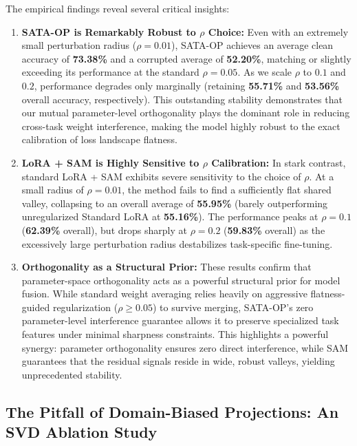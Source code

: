 \documentclass{article}
\theoremstyle{plain}
\theoremstyle{definition}
\theoremstyle{remark}
\begin{document}
The empirical findings reveal several critical insights:
\begin{enumerate}
    \item \textbf{SATA-OP is Remarkably Robust to $\rho$ Choice:} Even with an extremely small perturbation radius ($\rho = 0.01$), SATA-OP achieves an average clean accuracy of \textbf{73.38\%} and a corrupted average of \textbf{52.20\%}, matching or slightly exceeding its performance at the standard $\rho=0.05$. As we scale $\rho$ to $0.1$ and $0.2$, performance degrades only marginally (retaining \textbf{55.71\%} and \textbf{53.56\%} overall accuracy, respectively). This outstanding stability demonstrates that our mutual parameter-level orthogonality plays the dominant role in reducing cross-task weight interference, making the model highly robust to the exact calibration of loss landscape flatness.
    \item \textbf{LoRA + SAM is Highly Sensitive to $\rho$ Calibration:} In stark contrast, standard LoRA + SAM exhibits severe sensitivity to the choice of $\rho$. At a small radius of $\rho = 0.01$, the method fails to find a sufficiently flat shared valley, collapsing to an overall average of \textbf{55.95\%} (barely outperforming unregularized Standard LoRA at \textbf{55.16\%}). The performance peaks at $\rho = 0.1$ (\textbf{62.39\%} overall), but drops sharply at $\rho=0.2$ (\textbf{59.83\%} overall) as the excessively large perturbation radius destabilizes task-specific fine-tuning.
    \item \textbf{Orthogonality as a Structural Prior:} These results confirm that parameter-space orthogonality acts as a powerful structural prior for model fusion. While standard weight averaging relies heavily on aggressive flatness-guided regularization ($\rho \ge 0.05$) to survive merging, SATA-OP's zero parameter-level interference guarantee allows it to preserve specialized task features under minimal sharpness constraints. This highlights a powerful synergy: parameter orthogonality ensures zero direct interference, while SAM guarantees that the residual signals reside in wide, robust valleys, yielding unprecedented stability.
\end{enumerate}

\subsection{The Pitfall of Domain-Biased Projections: An SVD Ablation Study}
\end{document}
